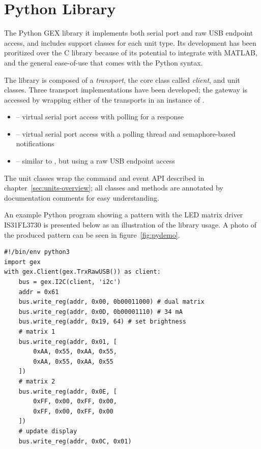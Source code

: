 \section{Python Library}

The Python GEX library it implements both serial port and raw USB endpoint access, and includes support classes for each unit type. Its development has been proritized over the C library because of its potential to integrate with MATLAB, and the general ease-of-use that comes with the Python syntax.

The library is composed of a \textit{transport}, the core class called \textit{client}, and unit classes. Three transport implementations have been developed; the gateway is accessed by wrapping either of the transports in an instance of .

\begin{itemize}
	\item {} -- virtual serial port access with polling for a response

	\item {} -- virtual serial port access with a polling thread and semaphore-based notifications

	\item {} -- similar to , but using a raw USB endpoint access
\end{itemize}

The unit classes wrap the command and event \gls{API} described in chapter~\ref{sec:units-overview}; all classes and methods are annotated by documentation comments for easy understanding.

An example Python program showing a pattern with the \gls{LED} matrix driver IS31FL3730 is presented below as an illustration of the library usage. A photo of the produced pattern can be seen in figure~\ref{fig:pydemo}.

\begin{verbatim}
#!/bin/env python3
import gex
with gex.Client(gex.TrxRawUSB()) as client:
    bus = gex.I2C(client, 'i2c')
    addr = 0x61
    bus.write_reg(addr, 0x00, 0b00011000) # dual matrix
    bus.write_reg(addr, 0x0D, 0b00001110) # 34 mA
    bus.write_reg(addr, 0x19, 64) # set brightness
    # matrix 1
    bus.write_reg(addr, 0x01, [
        0xAA, 0x55, 0xAA, 0x55,
        0xAA, 0x55, 0xAA, 0x55
    ])
    # matrix 2
    bus.write_reg(addr, 0x0E, [
        0xFF, 0x00, 0xFF, 0x00,
        0xFF, 0x00, 0xFF, 0x00
    ])
    # update display
    bus.write_reg(addr, 0x0C, 0x01)
\end{verbatim}

